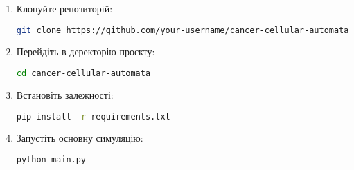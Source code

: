 \documentclass[12pt]{article}
\begin{document}
\begin{enumerate}
    \item Клонуйте репозиторій:
    \begin{lstlisting}[language=bash]
git clone https://github.com/your-username/cancer-cellular-automata.git
    \end{lstlisting}
    
    \item Перейдіть в деректорію проєкту:
    \begin{lstlisting}[language=bash]
cd cancer-cellular-automata
    \end{lstlisting}
    
    \item Встановіть залежності:
    \begin{lstlisting}[language=bash]
pip install -r requirements.txt
    \end{lstlisting}
    
    \item Запустіть основну симуляцію:
    \begin{lstlisting}[language=bash]
python main.py
    \end{lstlisting}
\end{enumerate}
\end{document}
